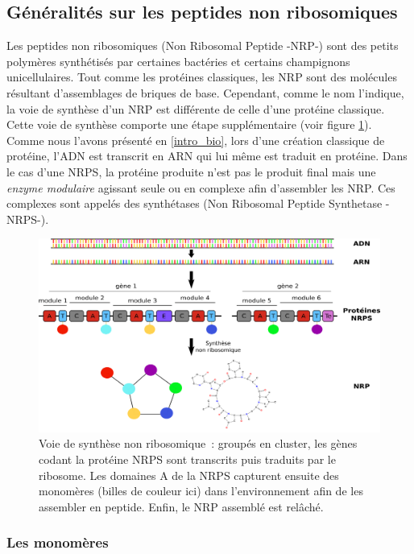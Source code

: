 \subsection{Généralités sur les peptides non ribosomiques}
Les peptides non ribosomiques (Non Ribosomal Peptide -NRP-) sont des petits polymères synthétisés par certaines bactéries et certains champignons unicellulaires.
Tout comme les protéines classiques, les NRP sont des molécules résultant d'assemblages de briques de base.
Cependant, comme le nom l'indique, la voie de synthèse d'un NRP est différente de celle d'une protéine classique.
Cette voie de synthèse comporte une étape supplémentaire (voir figure \ref{global}).
Comme nous l'avons présenté en \ref{intro_bio}, lors d'une création classique de protéine, l'ADN est transcrit en ARN qui lui même est traduit en protéine.
Dans le cas d'une NRPS, la protéine produite n'est pas le produit final mais une \textit{enzyme modulaire} agissant seule ou en complexe afin d'assembler les NRP.
Ces complexes sont appelés des synthétases (Non Ribosomal Peptide Synthetase -NRPS-).

\begin{figure}[h!]
  \begin{center}
    \includegraphics[width=450px]{Figures/bio/Intro/synthese.png}
    \caption{\label{global}Voie de synthèse non ribosomique~:
    groupés en cluster, les gènes codant la protéine NRPS sont transcrits puis traduits par le ribosome.
    Les domaines A de la NRPS capturent ensuite des monomères (billes de couleur ici) dans l'environnement afin de les assembler en peptide.
    Enfin, le NRP assemblé est relâché.
    }
  \end{center}
\end{figure}

\subsubsection{Les monomères}

